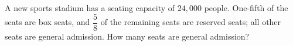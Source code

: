A new sports stadium has a seating capacity of $24{,}000$ people. One-fifth of the seats are box seats, and $\dfrac{5}{8}$ of the remaining seats are reserved seats; all other seats are general admission. How many seats are general admission?
